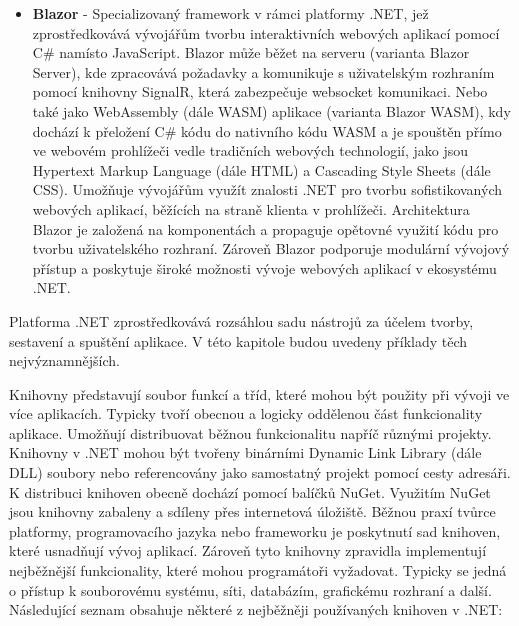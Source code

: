 \begin{itemize}
    \item \textbf{Blazor} - Specializovaný framework v rámci platformy .NET, jež zprostředkovává vývojářům tvorbu interaktivních webových aplikací pomocí C\# namísto JavaScript. Blazor může běžet na serveru (varianta Blazor Server), kde zpracovává požadavky a komunikuje s uživatelským rozhraním pomocí knihovny SignalR, která zabezpečuje websocket komunikaci. Nebo také jako WebAssembly (dále WASM) aplikace (varianta Blazor WASM), kdy dochází k přeložení C\# kódu do nativního kódu WASM a je spouštěn přímo ve webovém prohlížeči vedle tradičních webových technologií, jako jsou Hypertext Markup Language (dále HTML) a Cascading Style Sheets (dále CSS). \cite{Price2023c8} Umožňuje vývojářům využít znalosti .NET pro tvorbu sofistikovaných webových aplikací, běžících na straně klienta v prohlížeči. Architektura Blazor je založená na komponentách a propaguje opětovné využití kódu pro tvorbu uživatelského rozhraní. Zároveň Blazor podporuje modulární vývojový přístup a poskytuje široké možnosti vývoje webových aplikací v ekosystému .NET.
\end{itemize}


Platforma .NET zprostředkovává rozsáhlou sadu nástrojů za účelem tvorby, sestavení a spuštění aplikace. V této kapitole budou uvedeny příklady těch nejvýznamnějších.


Knihovny představují soubor funkcí a tříd, které mohou být použity při vývoji ve více aplikacích. Typicky tvoří obecnou a logicky oddělenou část funkcionality aplikace. Umožňují distribuovat běžnou funkcionalitu napříč různými projekty. \cite{Price2023c8}  Knihovny v .NET mohou být tvořeny binárními Dynamic Link Library (dále DLL) soubory nebo referencovány jako samostatný projekt pomocí cesty adresáři. K distribuci knihoven obecně dochází pomocí balíčků NuGet. Využitím NuGet jsou knihovny zabaleny a sdíleny přes internetová úložiště. Běžnou praxí tvůrce platformy, programovacího jazyka nebo frameworku je poskytnutí sad knihoven, které usnadňují vývoj aplikací. Zároveň tyto knihovny zpravidla implementují nejběžnější funkcionality, které mohou programátoři vyžadovat. Typicky se jedná o přístup k souborovému systému, síti, databázím, grafickému rozhraní a další. Následující seznam obsahuje některé z nejběžněji používaných knihoven v .NET:

